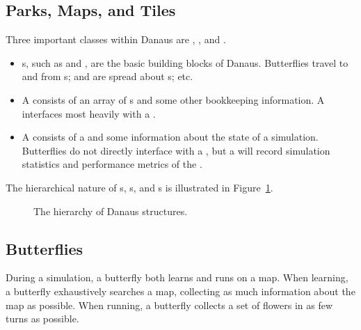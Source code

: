 \documentclass{pset}
\begin{document}
\subsection{Parks, Maps, and Tiles}
Three important classes within Danaus are , , and
.
\begin{itemize}
    \item {}s, such as  and , are the basic
      building blocks of Danaus. Butterflies travel to and from s;
       and  are spread about s; etc.
    \item A  consists of an array of s and some other
      bookkeeping information. A  interfaces most heavily with
      a . 
    \item A  consists of a  and some information about the
      state of a simulation. Butterflies do not directly interface with a
      , but a  will record simulation statistics and
      performance metrics of the .  
\end{itemize}

The hierarchical nature of s, s, and s is
illustrated in Figure~\ref{fig:tileparkmap}.

\begin{figure}[h]
  \centering
  
  \def\firstcircle{(0,0) circle (1cm)}
  \def\secondcircle{(0,0) circle (2cm)}
  \def\thirdcircle{(0,0) circle (3cm)}

  \caption{The hierarchy of Danaus structures.}
  \label{fig:tileparkmap}
\end{figure}
\fi

\ifx \BUTTERFLIES \undefined \else
\subsection{Butterflies}
During a simulation, a butterfly both learns and runs on a map. When learning,
a butterfly exhaustively searches a map, collecting as much information about
the map as possible. When running, a butterfly collects a set of flowers in as
few turns as possible.
\fi
\end{document}
